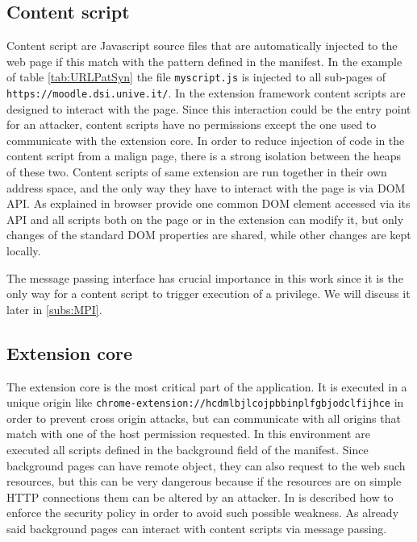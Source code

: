 \subsection{Content script}
Content script are Javascript source files that are automatically injected to the web page if this match with the pattern defined in the manifest. In the example of table \ref{tab:URLPatSyn} the file \texttt{myscript.js} is injected to all sub-pages of \texttt{https://moodle.dsi.unive.it/}. In the extension framework content scripts are designed to interact with the page. Since this interaction could be the entry point for an attacker, content scripts have no permissions except the one used to communicate with the extension core. In order to reduce injection of code in the content script from a malign page, there is a strong isolation between the heaps of these two. Content scripts of same extension are run together in their own address space, and the only way they have to interact with the page is via DOM API. As explained in \cite{ChromeExtSpec} browser provide one common DOM element accessed via its API and all scripts both on the page or in the extension can modify it, but only changes of the standard DOM properties are shared, while other changes are kept locally. 

The message passing interface has crucial importance in this work since it is the only way for a content script to trigger execution of a privilege. We will discuss it later in \ref{subs:MPI}.

\subsection{Extension core}
The extension core is the most critical part of the application. It is executed in a unique origin like \texttt{chrome-extension://hcdmlbjlcojpbbinplfgbjodclfijhce} in order to prevent cross origin attacks, but can communicate with all origins that match with one of the host permission requested. In this environment are executed all scripts defined in the background field of the manifest. Since background pages can have remote object, they can also request to the web such resources, but this can be very dangerous because if the resources are on simple HTTP connections them can be altered by an attacker. In \cite{ChromeExtSpecSnd} is described how to enforce the security policy in order to avoid such possible weakness. As already said background pages can interact with content scripts via message passing.


